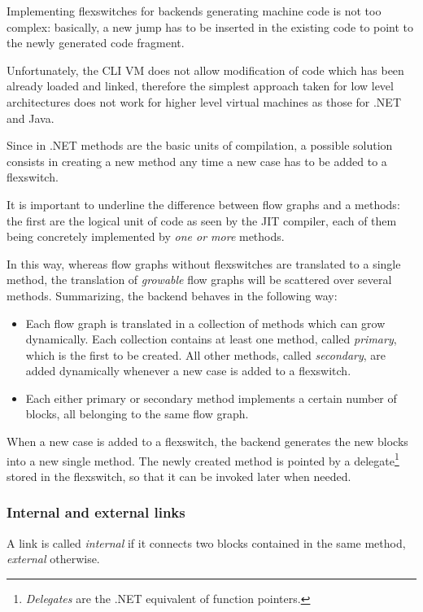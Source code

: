 Implementing flexswitches for backends generating machine code is
not too complex: basically, a new jump has to be inserted in the
existing code to point to the newly generated code fragment.

Unfortunately, the CLI VM does not allow modification of code which
has been already loaded and linked, therefore the simplest approach
taken for low level architectures does not work for higher level 
virtual machines as those for .NET and Java.

Since in .NET methods are the basic units of compilation, a possible
solution consists in creating a new method 
any time a new case has to be added to a flexswitch.

It is important to underline the difference between flow graphs and a methods:
the first are the logical unit of code as seen by the JIT compiler, each of
them being concretely implemented by \emph{one or more} methods.

In this way, whereas flow graphs without flexswitches are translated to a
single method, the translation of \emph{growable} flow graphs will be
scattered over several methods.  Summarizing, the backend behaves in the
following way:
\begin{itemize}
\item Each flow graph is translated in a collection of methods which
  can grow dynamically. Each collection contains at least one
  method, called \emph{primary}, which is the first to be created.
  All other methods, called \emph{secondary}, are added dynamically 
  whenever a new case is added to a flexswitch.

\item Each either primary or secondary method implements a certain
  number of blocks, all belonging to the same flow graph.
\end{itemize} 

When a new case is added to a flexswitch, the backend generates the new blocks
into a new single method.  The newly created method is pointed by a
delegate\footnote{\emph{Delegates} are the .NET equivalent of function
  pointers.} stored in the flexswitch, so that it can be invoked later when
needed.

\subsubsection{Internal and external links}

A link is called \emph{internal} if it connects two blocks contained
in the same method,
\emph{external} otherwise.

